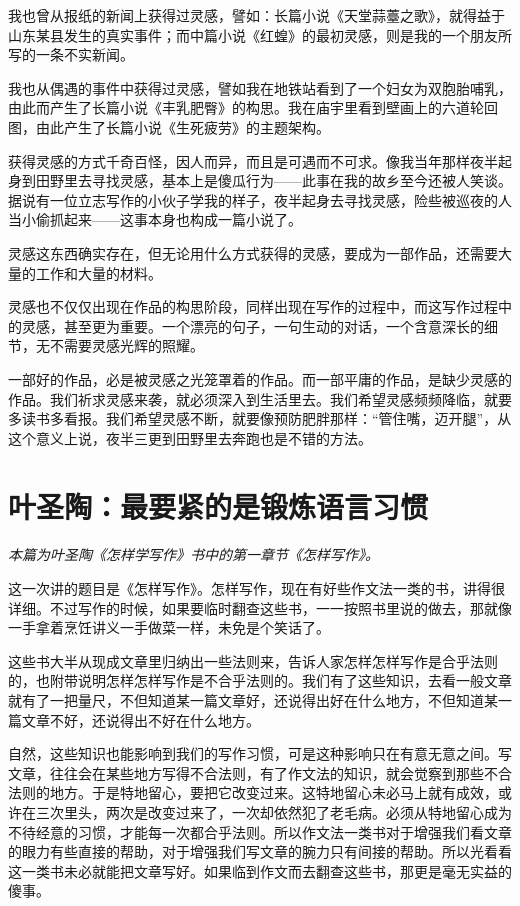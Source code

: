 \documentclass[fontset=fandol,12pt,a5paper]{ctexbook}
\begin{document}
我也曾从报纸的新闻上获得过灵感，譬如：长篇小说《天堂蒜薹之歌》，就得益于山东某县发生的真实事件；而中篇小说《红蝗》的最初灵感，则是我的一个朋友所写的一条不实新闻。

我也从偶遇的事件中获得过灵感，譬如我在地铁站看到了一个妇女为双胞胎哺乳，由此而产生了长篇小说《丰乳肥臀》的构思。我在庙宇里看到壁画上的六道轮回图，由此产生了长篇小说《生死疲劳》的主题架构。

获得灵感的方式千奇百怪，因人而异，而且是可遇而不可求。像我当年那样夜半起身到田野里去寻找灵感，基本上是傻瓜行为——此事在我的故乡至今还被人笑谈。据说有一位立志写作的小伙子学我的样子，夜半起身去寻找灵感，险些被巡夜的人当小偷抓起来——这事本身也构成一篇小说了。

灵感这东西确实存在，但无论用什么方式获得的灵感，要成为一部作品，还需要大量的工作和大量的材料。

灵感也不仅仅出现在作品的构思阶段，同样出现在写作的过程中，而这写作过程中的灵感，甚至更为重要。一个漂亮的句子，一句生动的对话，一个含意深长的细节，无不需要灵感光辉的照耀。

一部好的作品，必是被灵感之光笼罩着的作品。而一部平庸的作品，是缺少灵感的作品。我们祈求灵感来袭，就必须深入到生活里去。我们希望灵感频频降临，就要多读书多看报。我们希望灵感不断，就要像预防肥胖那样：“管住嘴，迈开腿”，从这个意义上说，夜半三更到田野里去奔跑也是不错的方法。
\newpage

\section{叶圣陶：最要紧的是锻炼语言习惯}

\emph{本篇为叶圣陶《怎样学写作》书中的第一章节《怎样写作》。}
\vspace{2em}

这一次讲的题目是《怎样写作》。怎样写作，现在有好些作文法一类的书，讲得很详细。不过写作的时候，如果要临时翻查这些书，一一按照书里说的做去，那就像一手拿着烹饪讲义一手做菜一样，未免是个笑话了。

这些书大半从现成文章里归纳出一些法则来，告诉人家怎样怎样写作是合乎法则的，也附带说明怎样怎样写作是不合乎法则的。我们有了这些知识，去看一般文章就有了一把量尺，不但知道某一篇文章好，还说得出好在什么地方，不但知道某一篇文章不好，还说得出不好在什么地方。

自然，这些知识也能影响到我们的写作习惯，可是这种影响只在有意无意之间。写文章，往往会在某些地方写得不合法则，有了作文法的知识，就会觉察到那些不合法则的地方。于是特地留心，要把它改变过来。这特地留心未必马上就有成效，或许在三次里头，两次是改变过来了，一次却依然犯了老毛病。必须从特地留心成为不待经意的习惯，才能每一次都合乎法则。所以作文法一类书对于增强我们看文章的眼力有些直接的帮助，对于增强我们写文章的腕力只有间接的帮助。所以光看看这一类书未必就能把文章写好。如果临到作文而去翻查这些书，那更是毫无实益的傻事。
\end{document}
